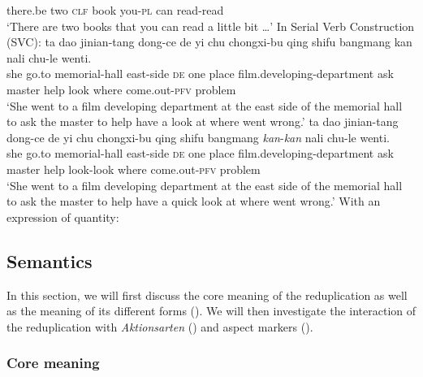 		there.be two \textsc{clf} book you-\textsc{pl} can read-read\\ 
		\glt `There are two books that you can read a little bit \ldots'
		\z
	\ex In Serial Verb Construction (SVC):
		\ea \gll ta dao jinian-tang dong-ce de yi chu chongxi-bu qing shifu bangmang kan nali chu-le wenti.\\
		she go.to memorial-hall east-side \textsc{de} one place film.developing-department ask master help look where come.out-\textsc{pfv} problem\\
		\glt `She went to a film developing department at the east side of the memorial hall to ask the master to help have a look at where went wrong.'
		\ex \gll ta dao jinian-tang dong-ce de yi chu chongxi-bu qing shifu bangmang \textit{kan}-\textit{kan} nali chu-le wenti.\\
		she go.to memorial-hall east-side \textsc{de} one place film.developing-department ask master help look-look where come.out-\textsc{pfv} problem\\ 
		\glt `She went to a film developing department at the east side of the memorial hall to ask the master to help have a quick look at where went wrong.'
		\z
	\ex With an expression of quantity: \label{ex:redup-quan}
		\z
	\z
\z




\subsection{Semantics}\label{sec:sem}

In this section, we will first discuss the core meaning of the reduplication as well as the meaning of its different forms ().
We will then investigate the interaction of the reduplication with \textit{Aktionsarten} () and aspect markers ().

\subsubsection{Core meaning}\label{sec:core-sem}

